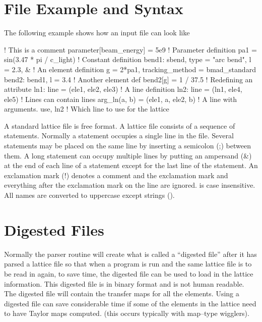 \section{File Example and Syntax}

The following example shows how an input file can look like
\begin{example}
  ! This is a comment
  parameter[beam_energy] = 5e9                   ! Parameter definition
  pa1 = sin(3.47 * pi / c_light)                 ! Constant definition
  bend1: sbend, type = "arc bend", l = 2.3, &    ! An element definition
      g = 2*pa1, tracking_method = bmad_standard
  bend2: bend1, l = 3.4                          ! Another element def
  bend2[g] = 1 / 37.5                            ! Redefining an attribute
  ln1: line = (ele1, ele2, ele3)                 ! A line definition
  ln2: line = (ln1, ele4, ele5)                  ! Lines can contain lines
  arg_ln(a, b) = (ele1, a, ele2, b)              ! A line with arguments.
  use, ln2                                       ! Which line to use for the lattice
\end{example}

A \bmad standard lattice file is free format. A \bmad lattice file consists
of a sequence of statements. Normally a statement occupies a single
line in the file. Several statements may be placed on the same line by
inserting a semicolon (;) between them. A long statement can occupy
multiple lines by putting an ampersand (\&) at the end of each line of
a statement except for the last line of the statement. An
exclamation mark (!) denotes a comment and the exclamation mark and
everything after the exclamation mark on the line are ignored. 
\bmad is case insensitive. All names are converted to uppercase except
strings ().

\section{Digested Files}
\label{s:lattice_files}

Normally the \bmad parser routine will create what is called a
``digested file'' after it has parsed a lattice file so that when a
program is run and the same lattice file is to be read in again, to save
time, the digested file can be used to load in the lattice information.
This digested file is in binary format and is not human readable. The
digested file will contain the transfer maps for all the elements. 
Using a digested file can save considerable time if some of the
elements in the lattice need to have Taylor maps computed.
(this occurs typically with map--type wigglers).


